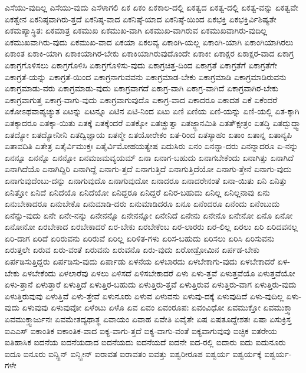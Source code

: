 {ಎಸೆಯು-ವುದಿಲ್ಲ
ಎಸೆಯು-ವುದು
ಎಸೆಳಾಗಲಿ
ಏಕ
ಏಕಂ
ಏಕಕಾಲ-ದಲ್ಲಿ
ಏಕತ್ವದ
ಏಕತ್ವ-ದಲ್ಲಿ
ಏಕತ್ವ-ವನ್ನು
ಏಕತ್ವವೇ
ಏಕತ್ವೇನ
ಏಕನಿಷ್ಠವಾಗಿರು-ತ್ತದೆ
ಏಕನಿಷ್ಠ-ವಾದ
ಏಕನಿಷ್ಠೆ-ಯಾದ
ಏಕನಿಷ್ಠೆ-ಯಿಂದ
ಏಕಭಕ್ತಿ
ಏಕಭಕ್ತಿರ್ವಿಶಿಷ್ಯತೇ
ಏಕಮಪ್ಯಾಸ್ಥಿತಃ
ಏಕಮಾತ್ರ
ಏಕಮುಖ
ಏಕಮುಖ-ವಾಗಿ
ಏಕಮುಖ-ವಾಗಿರುವ
ಏಕಮುಖವಾಗಿರು-ವುದಿಲ್ಲ
ಏಕಮುಖವಾಗಿರು-ವುದು
ಏಕಮುಖ-ವಾದ
ಏಕಯಾ
ಏಕಲವ್ಯ
ಏಕಾಂಗಿ-ಯಲ್ಲ
ಏಕಾಂಗಿ-ಯಾಗಿ
ಏಕಾಂಗಿಯಾಗಿರಲು
ಏಕಾಂತ
ಏಕಾಕಿ-ಯಾಗಿ
ಏಕಾಕಿಯಾಗಿರ-ಬೇಕು
ಏಕಾಕಿಯಾಗಿರುವುದೊಂದೇ
ಏಕಾಕೀ
ಏಕಾಕ್ಷರ
ಏಕಾಕ್ಷರ-ವಾದ
ಏಕಾಗ್ರ
ಏಕಾಗ್ರಗೊಳಿಸಲು
ಏಕಾಗ್ರಗೊಳಿಸಿ
ಏಕಾಗ್ರಗೊಳಿಸು-ವುದು
ಏಕಾಗ್ರಚಿತ್ತ-ದಿಂದ
ಏಕಾಗ್ರತೆ
ಏಕಾಗ್ರತೆಗೆ
ಏಕಾಗ್ರತೆಗೇ
ಏಕಾಗ್ರತೆ-ಯನ್ನು
ಏಕಾಗ್ರತೆ-ಯಿಂದ
ಏಕಾಗ್ರನಾಗುವವನು
ಏಕಾಗ್ರಮಾಡ-ಬೇಕು
ಏಕಾಗ್ರಮಾಡಿ
ಏಕಾಗ್ರಮಾಡಿರುವನು
ಏಕಾಗ್ರಮಾಡು-ವರು
ಏಕಾಗ್ರಮಾಡು-ವುದು
ಏಕಾಗ್ರವಾಗದೆ
ಏಕಾಗ್ರ-ವಾಗಿ
ಏಕಾಗ್ರ-ವಾಗಿದೆ
ಏಕಾಗ್ರವಾಗಿರ-ಬೇಕು
ಏಕಾಗ್ರವಾಗುತ್ತ
ಏಕಾಗ್ರ-ವಾಗು-ವುದು
ಏಕಾಗ್ರವಾಗುವುದೊ
ಏಕಾಗ್ರ-ವಾದ
ಏಕಾದರೂ
ಏಕಾದಶ
ಏಕೆ
ಏಕೆಂದರೆ
ಏಕೋಽಥವಾಪ್ಯಚ್ಯುತ
ಏಟನ್ನು
ಏಟನ್ನೂ
ಏಟಿನ
ಏಟಿ-ನಿಂದ
ಏಟು
ಏಣಿ
ಏಣಿಯ
ಏಣಿ-ಯನ್ನು
ಏಣಿ-ಯಲ್ಲಿ
ಏತ-ಕ್ಕಾಗಿ
ಏತಕ್ಕಾದರೂ
ಏತಕ್ಕಾ-ಯಿತು
ಏತಕ್ಕೆ
ಏತಕ್ಕೆಂದರೆ
ಏತಕ್ಕೋ
ಏತಚ್ಛ್ರುತ್ವಾ
ಏತಜ್ಜ್ಞಾನಮಿತಿ
ಏತತ್ಕ್ಷೇತ್ರಂ
ಏತದ್ಧಿ
ಏತದ್ಬುದ್ಧ್ವಾ
ಏತದ್ಯೋ
ಏತದ್ಯೋನೀನಿ
ಏತದ್ವಿಜ್ಞಾಯ
ಏತನ್ಮೇ
ಏತಯೋರೇಕಂ
ಏತ-ರಿಂದ
ಏತಸ್ಯಾಹಂ
ಏತಾಂ
ಏತಾನ್ನ
ಏತಾನ್ಯಪಿ
ಏತಾವದಿತಿ
ಏತೇತ್ರ
ಏತೈರ್ವಿಮುಕ್ತಃ
ಏತೈರ್ವಿಮೋಹಯತ್ಯೇಷ
ಏದುಸಿರು
ಏನಂ
ಏನನ್ನಾ-ದರು
ಏನನ್ನಾದರೂ
ಏ-ನನ್ನು
ಏನನ್ನೂ
ಏನನ್ನೊ
ಏನನ್ನೋ
ಏನಮಜಮವ್ಯಯಮ್
ಏನಾ
ಏನಾಗ-ಬಹುದು
ಏನಾಗಬೇಕೆಂದು
ಏನಾಗಿತ್ತು
ಏನಾಗಿದೆ
ಏನಾಗಿದೆಯೊ
ಏನಾಗಿದ್ದಿರಿ
ಏನಾಗಿದ್ದೆ
ಏನಾಗು-ತ್ತದೆ
ಏನಾಗುತ್ತಿದೆ
ಏನಾಗುತ್ತಿದೆಯೋ
ಏನಾಗು-ತ್ತೇನೆ
ಏನಾಗು-ವುದು
ಏನಾಗುವುದೆಂಬು-ದನ್ನು
ಏನಾಗುವುದೊ
ಏನಾಗುವುದೋ
ಏನಾದರೂ
ಏನಾದರೇನಂತೆ
ಏನಾ-ಯಿತು
ಏನಿ
ಏನಿತ್ತು
ಏನಿತ್ತೋ
ಏನಿದೆ
ಏನಿದೆಯೊ
ಏನಿದೆಯೋ
ಏನಿದ್ದರೂ
ಏನಿದ್ದರೆ
ಏನಿರ-ಬಹುದು
ಏನಿಲ್ಲ
ಏನಿಲ್ಲನಾವು
ಏನು
ಏನುಬೇಕಾದರೂ
ಏನುಬೇಕೊ
ಏನುಮಾಡಿ-ದರು
ಏನುಮಾಡಿದರೂ
ಏನೂ
ಏನೆಂದರೂ
ಏನೆಂದು
ಏನೆಂಬುದು
ಏನೆನ್ನು-ವುದು
ಏನೇ
ಏನೇ-ನನ್ನು
ಏನೇನನ್ನೊ
ಏನೇನನ್ನೋ
ಏನೇನಿದೆ
ಏನೇನು
ಏನೇನೊ
ಏನೇನೋ
ಏನೊ
ಏನೋ
ಏನೋನೋ
ಏರಬೇಕಾದ
ಏರಬೇಕಾದರೆ
ಏರ-ಬೇಕು
ಏರಬೇಕೆಂಬ
ಏರ-ಲಾರರು
ಏರ-ಲಿಲ್ಲ
ಏರಲು
ಏರಿ
ಏರಿದವನಲ್ಲ
ಏರಿ-ದಾಗ
ಏರಿದೆ
ಏರಿರುವನು
ಏರಿರುವೆ
ಏರಿಲ್ಲ
ಏರಿಳಿತ-ಗಳು
ಏರಿಸ-ಬಹುದು
ಏರಿಸಲು
ಏರಿಸಿ
ಏರಿಸುವನು
ಏರುತ್ತಲೇ
ಏರುವ
ಏರು-ವಂತೆ
ಏರುವನು
ಏರುವನೊ
ಏರು-ವುದು
ಏರೋಡ್ರೋಮಿನ
ಏರ್ಪಡ-ಬೇಕು
ಏರ್ಪಡಿಸುತ್ತಿದ್ದರು
ಏರ್ಪಡಿಸು-ವುದು
ಏರ್ಪಾಡು
ಏಳನೆಯ
ಏಳಬಾರದು
ಏಳಬೇಕಾಗು-ವುದು
ಏಳಬೇಕಾದರೆ
ಏಳ-ಬೇಕು
ಏಳಬೇಕೆಂದು
ಏಳಲಾರೆವು
ಏಳಲು
ಏಳಿಸದೆ
ಏಳಿಸಬೇಕಾದರೆ
ಏಳು
ಏಳು-ತ್ತವೆ
ಏಳುತ್ತವೆಯೊ
ಏಳುತ್ತವೆಯೋ
ಏಳು-ತ್ತಾನೆ
ಏಳುತ್ತಾರೆ
ಏಳುತ್ತಿದೆ
ಏಳುತ್ತಿರ-ಬಹುದು
ಏಳುತ್ತಿರು-ತ್ತವೆ
ಏಳುತ್ತಿರುವ
ಏಳುತ್ತಿರು-ವಾಗ
ಏಳುತ್ತಿರು-ವುದು
ಏಳುತ್ತಿರುವುವು
ಏಳುತ್ತಿವೆ
ಏಳು-ತ್ತೇವೆ
ಏಳುನೂರು
ಏಳುವ
ಏಳುವನು
ಏಳುವು-ದಕ್ಕೆ
ಏಳುವುದಿದೆ
ಏಳು-ವುದಿಲ್ಲ
ಏಳು-ವುದು
ಏಳುವುವು
ಏಳುವುವೋ
ಏಳೆಂಟು
ಏಳೊ
ಏವ
ಏವಂ
ಏವಂರೂಪಃ
ಏವಂವಿಧೋ
ಏವಮುಕ್ತೋ
ಏವಮುಕ್ತ್ವಾ
ಏವಮುಕ್ತ್ವಾರ್ಜುನಃ
ಏವಮೇತದ್ಯಥಾತ್ಥ
ಏವಾಯಂ
ಏವಾಹ
ಏವೇತಿ
ಏವೈತೇ
ಏಷ
ಏಷತೂದ್ದೇಶತಃ
ಏಷಾ
ಏಸುಕ್ರಿಸ್ತ
ಐಎಎಸ್
ಐಕಾಂತಿಕ
ಐಕಾಂತಿಕ-ವಾದ
ಐಕ್ಯ-ವಾಗು-ತ್ತದೆ
ಐಕ್ಯ-ವಾಗು-ವಂತೆ
ಐಕ್ಯವಾಗುವುವು
ಐಚ್ಛಿಕ
ಐತರೇಯ
ಐತಿಹಾಸಿಕ
ಐದನೆಯ
ಐದನೆಯದಾದ
ಐದನೆಯದು
ಐದನೆಯದೆ
ಐದನೇ
ಐದ-ರಲ್ಲಿ
ಐದಾರು
ಐದು
ಐದುನೂರು
ಐದೂ
ಐನೂರು
ಐನ್ಸ್ಟಿನ್
ಐನ್ಸ್ಟೀನ್
ಐರಾವತ
ಐರಾವತಂ
ಐವತ್ತು
ಐಶ್ವರೀರೂಪ
ಐಶ್ವರ್ಯ
ಐಶ್ವರ್ಯಕ್ಕೆ
ಐಶ್ವರ್ಯ-ಗಳೇ
}
